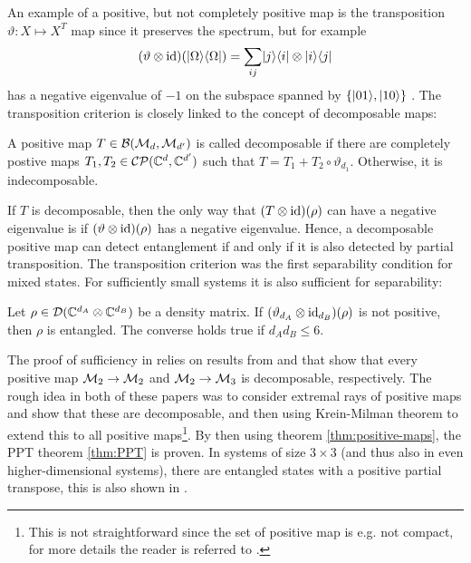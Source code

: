 An example of a positive, but not completely positive map is the transposition $\vartheta: X\mapsto X^T$ map since it preserves the spectrum, but for example
\begin{align}
    (\vartheta \otimes \mathrm{id})(\lvert\Omega\rangle\langle\Omega\rvert) = \sum_{ij}\lvert j\rangle\langle i\rvert\otimes \lvert i\rangle\langle j\rvert
\end{align}
has a negative eigenvalue of $-1$ on the subspace spanned by $\{\lvert01\rangle,\lvert10\rangle\}$ \cite{Peres1996}. The transposition criterion is closely linked to the concept of decomposable maps:
\begin{definition}[Decomposability]
    A positive map $T\in \mathcal B(\mathcal M_d , \mathcal M_{d'})$ is called decomposable if there are completely postive maps $T_1, T_2 \in \mathcal{CP}(\mathbb{C}^d,\mathbb{C}^{d'})$ such that $T = T_1+T_2 \circ \vartheta_{d_1}$. Otherwise, it is indecomposable.
\end{definition}
If $T$ is decomposable, then the only way that $(T\otimes \mathrm{id})(\rho)$ can have a negative eigenvalue is if $(\vartheta \otimes \mathrm{id})(\rho)$ has a negative eigenvalue. Hence, a decomposable positive map can detect entanglement if and only if it is also detected by partial transposition. The transposition criterion was the first separability condition for mixed states. For sufficiently small systems it is also sufficient for separability:
\begin{theorem}Let $\rho \in \mathcal D(\mathbb{C}^{d_A}\otimes \mathbb{C}^{d_B})$ be a density matrix. If $(\vartheta_{d_A}\otimes \mathrm{id}_{d_B})(\rho)$ is not positive, then $\rho$ is entangled. The converse holds true if $d_Ad_B \leq 6$.{}\label{thm:PPT}
\end{theorem}
The proof of sufficiency in \cite{Horodecki1996} relies on results from \cite{Stormer1963} and \cite{Woronowicz1976} that show that every positive map $\mathcal M_2 \rightarrow \mathcal M_2$ and $\mathcal M_2 \rightarrow \mathcal M_3$ is decomposable, respectively. The rough idea in both of these papers was to consider extremal rays of positive maps and show that these are decomposable, and then using Krein-Milman theorem to extend this to all positive maps\footnote{This is not straightforward since the set of positive map is e.g. not compact, for more details the reader is referred to \cite{Horodecki1996}.}. By then using theorem \ref{thm:positive-maps}, the PPT theorem \ref{thm:PPT} is proven. In systems of size $3\times 3$ (and thus also in even higher-dimensional systems), there are entangled states with a positive partial transpose, this is also shown in \cite{Woronowicz1976}.

